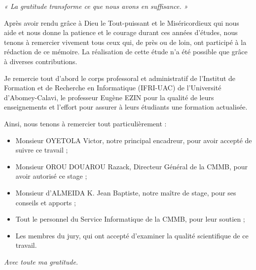 \remerciements

\begin{center}
\textit{« La gratitude transforme ce que nous avons en suffisance. »}
\end{center}

\vspace{0.3cm}

Après avoir rendu grâce à Dieu le Tout-puissant et le Miséricordieux qui nous aide et nous donne la patience et le courage durant ces années d’études, nous tenons à remercier vivement tous ceux qui, de près ou de loin, ont participé à la rédaction de ce mémoire. La réalisation de cette étude n’a été possible que grâce à diverses contributions.

Je remercie tout d’abord le corps professoral et administratif de l’Institut de Formation et de Recherche en Informatique (IFRI-UAC) de l’Université d’Abomey-Calavi, le professeur Eugène EZIN pour la qualité de leurs enseignements et l’effort pour assurer à leurs étudiants une formation actualisée.  

Ainsi, nous tenons à remercier tout particulièrement :  
\begin{itemize}
    \item Monsieur OYETOLA Victor, notre principal encadreur, pour avoir accepté de suivre ce travail ;
    \item Monsieur OROU DOUAROU Razack, Directeur Général de la \gls{CMMB}, pour avoir autorisé ce stage ;
    \item Monsieur d’ALMEIDA K. Jean Baptiste, notre maître de stage, pour ses conseils et apports ;
    \item Tout le personnel du Service Informatique de la \gls{CMMB}, pour leur soutien ;
    \item Les membres du jury, qui ont accepté d’examiner la qualité scientifique de ce travail.
\end{itemize}

\nopagebreak
\vspace{0.3cm}
\nopagebreak
\begin{flushright}
\textit{Avec toute ma gratitude.}
\end{flushright}

